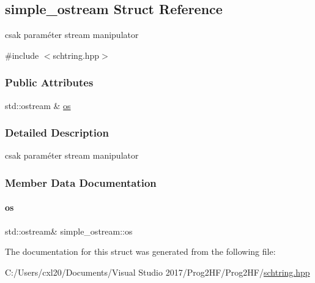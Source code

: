 \subsection{simple\+\_\+ostream Struct Reference}
\label{structsimple__ostream}


csak paraméter stream manipulator  




{\ttfamily \#include $<$schtring.\+hpp$>$}

\subsubsection*{Public Attributes}
\begin{DoxyCompactItemize}
\item 
std\+::ostream \& \mbox{\hyperlink{structsimple__ostream_a03c5c03d9aea0bfa4a4f403dff78f1ec}{os}}
\end{DoxyCompactItemize}


\subsubsection{Detailed Description}
csak paraméter stream manipulator 

\subsubsection{Member Data Documentation}
\mbox{\label{structsimple__ostream_a03c5c03d9aea0bfa4a4f403dff78f1ec}} 
\paragraph{\texorpdfstring{os}{os}}
{\footnotesize\ttfamily std\+::ostream\& simple\+\_\+ostream\+::os}



The documentation for this struct was generated from the following file\+:\begin{DoxyCompactItemize}
\item 
C\+:/\+Users/cxl20/\+Documents/\+Visual Studio 2017/\+Prog2\+H\+F/\+Prog2\+H\+F/\mbox{\hyperlink{schtring_8hpp}{schtring.\+hpp}}\end{DoxyCompactItemize}
